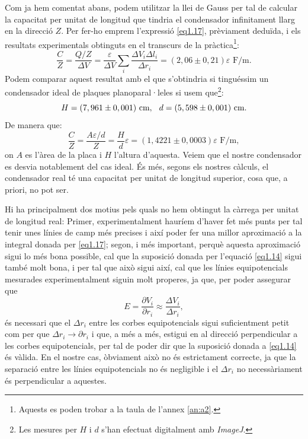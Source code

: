 \documentclass[a4paper,10.5pt]{report}
\begin{document}
Com ja hem comentat abans, podem utilitzar la llei de Gauss per tal de calcular la capacitat per unitat de longitud que tindria el condensador infinitament llarg en la direcció $Z$. Per fer-ho emprem l'expressió \eqref{eq1.17}, prèviament deduïda, i els resultats experimentals obtinguts en el transcurs de la pràctica\footnote{Aquests es poden trobar a la taula de l'annex \ref{an:a2}.}:
\begin{equation}
	\frac{C}{Z} = \frac{Q/Z}{\Delta V} = \frac{\varepsilon}{\Delta V} \sum_i \frac{\Delta V_i \Delta l_i}{\Delta r_i} = (2,06 \pm 0,21)\varepsilon \text{ F/m}.
\end{equation}
Podem comparar aquest resultat amb el que s'obtindria si tinguéssim un condensador ideal de plaques planoparal·leles si usem que\footnote{Les mesures per $H$ i $d$ s'han efectuat digitalment amb \textit{ImageJ}.}:
\begin{equation*}
	H = (7,961\pm0,001) \text{ cm}, \hspace{0.25cm} d = (5,598\pm0,001) \text{ cm}.
\end{equation*}
De manera que:
\begin{equation}
	\frac{C}{Z} = \frac{A\varepsilon/d}{Z} = \frac{H}{d}\varepsilon = (1,4221 \pm 0,0003)\varepsilon \text{ F/m},
\end{equation}
on $A$ es l'àrea de la placa i $H$ l'altura d'aquesta. 
Veiem que el nostre condensador es desvia notablement del cas ideal. És més, segons els nostres càlculs, el condensador real té una capacitat per unitat de longitud superior, cosa que, a priori, no pot ser. 

Hi ha principalment dos motius pels quals no hem obtingut la càrrega per unitat de longitud real: Primer, experimentalment hauríem d'haver fet més punts per tal tenir unes línies de camp més precises i així poder fer una millor aproximació a la integral donada per \eqref{eq1.17}; segon, i més important, perquè aquesta aproximació sigui lo més bona possible, cal que la suposició donada per l'equació \eqref{eq1.14} sigui també molt bona, i per tal que això sigui així, cal que les línies equipotencials mesurades experimentalment siguin molt properes, ja que, per poder assegurar que
\begin{equation}
	E = \frac{\partial V_i}{\partial r_i} \approx \frac{\Delta V_i}{\Delta r_i},
\end{equation}
és necessari que el $\Delta r_i$ entre les corbes equipotencials sigui suficientment petit com per que $\Delta r_i \rightarrow \partial r_i$ i que, a més a més, estigui en al direcció perpendicular a les corbes equipotencials, per tal de poder dir que la suposició donada a \eqref{eq1.14} és vàlida. En el nostre cas, òbviament això no és estrictament correcte, ja que la separació entre les línies equipotencials no és negligible i el $\Delta r_i$ no necessàriament és perpendicular a aquestes. 
\end{document}
